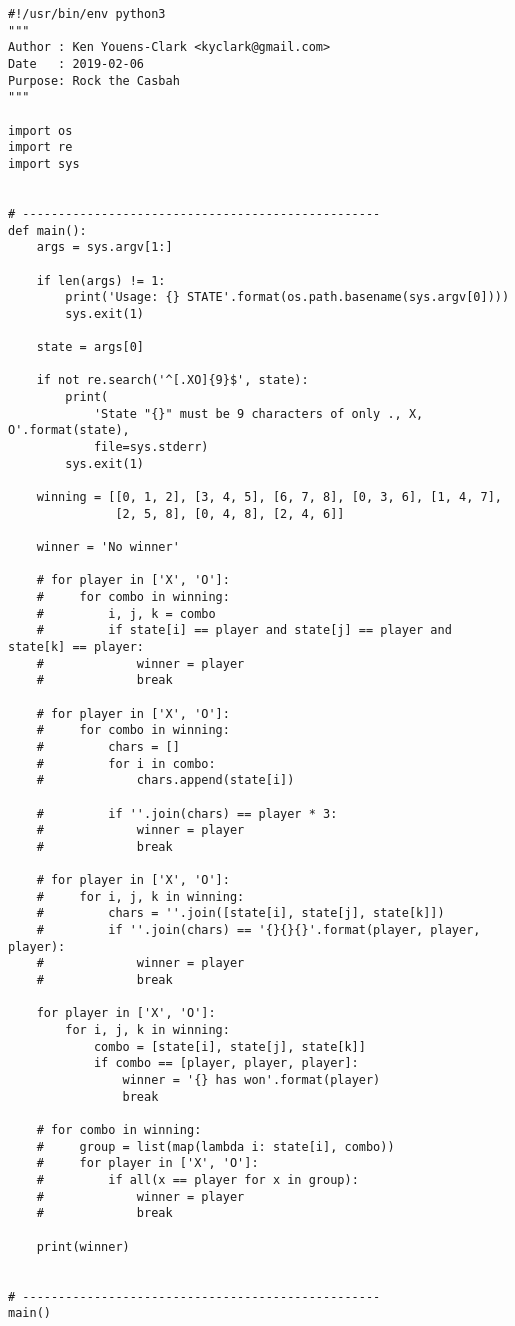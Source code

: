 \documentclass[]{article}
\begin{document}
\begin{verbatim}
#!/usr/bin/env python3
"""
Author : Ken Youens-Clark <kyclark@gmail.com>
Date   : 2019-02-06
Purpose: Rock the Casbah
"""

import os
import re
import sys


# --------------------------------------------------
def main():
    args = sys.argv[1:]

    if len(args) != 1:
        print('Usage: {} STATE'.format(os.path.basename(sys.argv[0])))
        sys.exit(1)

    state = args[0]

    if not re.search('^[.XO]{9}$', state):
        print(
            'State "{}" must be 9 characters of only ., X, O'.format(state),
            file=sys.stderr)
        sys.exit(1)

    winning = [[0, 1, 2], [3, 4, 5], [6, 7, 8], [0, 3, 6], [1, 4, 7],
               [2, 5, 8], [0, 4, 8], [2, 4, 6]]

    winner = 'No winner'

    # for player in ['X', 'O']:
    #     for combo in winning:
    #         i, j, k = combo
    #         if state[i] == player and state[j] == player and state[k] == player:
    #             winner = player
    #             break

    # for player in ['X', 'O']:
    #     for combo in winning:
    #         chars = []
    #         for i in combo:
    #             chars.append(state[i])

    #         if ''.join(chars) == player * 3:
    #             winner = player
    #             break

    # for player in ['X', 'O']:
    #     for i, j, k in winning:
    #         chars = ''.join([state[i], state[j], state[k]])
    #         if ''.join(chars) == '{}{}{}'.format(player, player, player):
    #             winner = player
    #             break

    for player in ['X', 'O']:
        for i, j, k in winning:
            combo = [state[i], state[j], state[k]]
            if combo == [player, player, player]:
                winner = '{} has won'.format(player)
                break

    # for combo in winning:
    #     group = list(map(lambda i: state[i], combo))
    #     for player in ['X', 'O']:
    #         if all(x == player for x in group):
    #             winner = player
    #             break

    print(winner)


# --------------------------------------------------
main()
\end{verbatim}
\end{document}
